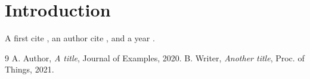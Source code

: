 \documentclass{lxtest_unbound_journal_xyz}
\begin{document}
\section{Introduction}
A first cite \citep{foo}, an author cite \citet{bar}, and a year \citeyear{foo}.

\begin{thebibliography}{9}
 A. Author, \emph{A title}, Journal of Examples, 2020.
 B. Writer, \emph{Another title}, Proc. of Things, 2021.
\end{thebibliography}
\end{document}
